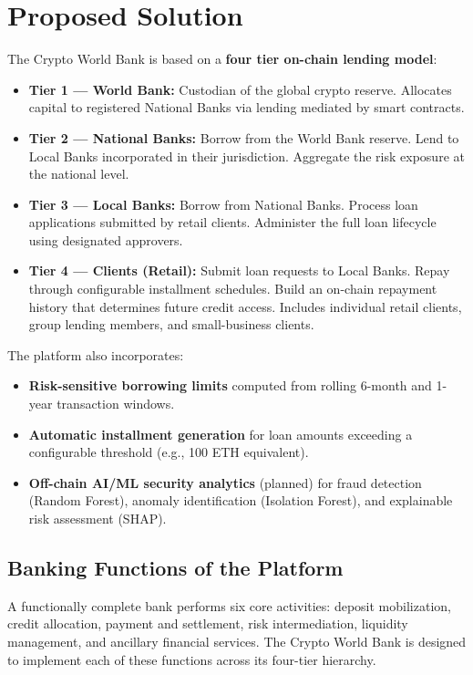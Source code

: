 \documentclass[12pt,a4paper]{report}
\begin{document}
\section{Proposed Solution}

The Crypto World Bank is based on a \textbf{four tier on-chain lending model}:

\begin{itemize}[noitemsep]
\item \textbf{Tier 1 --- World Bank:} Custodian of the global crypto reserve. Allocates capital to registered National Banks via lending mediated by smart contracts.
\item \textbf{Tier 2 --- National Banks:} Borrow from the World Bank reserve. Lend to Local Banks incorporated in their jurisdiction. Aggregate the risk exposure at the national level.
\item \textbf{Tier 3 --- Local Banks:} Borrow from National Banks. Process loan applications submitted by retail clients. Administer the full loan lifecycle using designated approvers.
\item \textbf{Tier 4 --- Clients (Retail):} Submit loan requests to Local Banks. Repay through configurable installment schedules. Build an on-chain repayment history that determines future credit access. Includes individual retail clients, group lending members, and small-business clients.
\end{itemize}

The platform also incorporates:

\begin{itemize}[noitemsep]
\item \textbf{Risk-sensitive borrowing limits} computed from rolling 6-month and 1-year transaction windows.
\item \textbf{Automatic installment generation} for loan amounts exceeding a configurable threshold (e.g., 100 ETH equivalent).
\item \textbf{Off-chain AI/ML security analytics} (planned) for fraud detection (Random Forest), anomaly identification (Isolation Forest), and explainable risk assessment (SHAP).
\end{itemize}

\subsection{Banking Functions of the Platform}

A functionally complete bank performs six core activities: deposit mobilization, credit allocation, payment and settlement, risk intermediation, liquidity management, and ancillary financial services. The Crypto World Bank is designed to implement each of these functions across its four-tier hierarchy.
\end{document}
